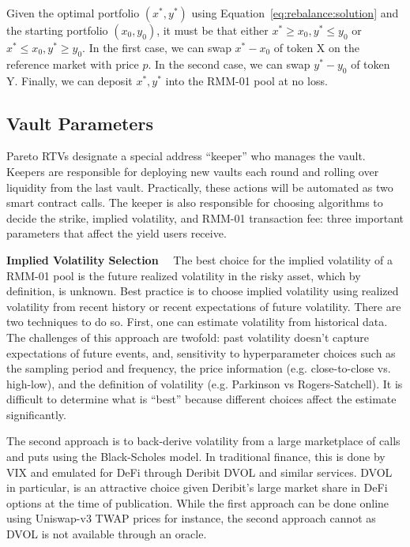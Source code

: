 \documentclass[hidelinks, 12pt]{article}
\begin{document}
Given the optimal portfolio $(x^*, y^*)$ using Equation~\ref{eq:rebalance:solution} and the starting portfolio $(x_0, y_0)$, it must be that either $x^* \geq x_0, y^* \leq y_0$ or $x^* \leq x_0, y^* \geq y_0$. In the first case, we can swap $x^* - x_0$ of token X on the reference market with price $p$. In the second case, we can swap $y^* - y_0$ of token Y. Finally, we can deposit $x^*, y^*$ into the RMM-01 pool at no loss.

\subsection{Vault Parameters}
\label{sec:management}

Pareto RTVs designate a special address ``keeper'' who manages the vault. Keepers are responsible for deploying new vaults each round and rolling over liquidity from the last vault. Practically, these actions will be automated as two smart contract calls.
The keeper is also responsible for choosing algorithms to decide the strike, implied volatility, and RMM-01 transaction fee: three important parameters that affect the yield users receive. 

\textbf{Implied Volatility Selection}$\quad$ The best choice for the implied volatility of a RMM-01 pool is the future realized volatility in the risky asset, which by definition, is unknown. 
Best practice is to choose implied volatility using realized volatility from recent history or recent expectations of future volatility.
There are two techniques to do so. First, one can estimate volatility from historical data. The challenges of this approach are twofold: past volatility doesn't capture expectations of future events, and, sensitivity to hyperparameter choices such as the sampling period and frequency, the price information (e.g. close-to-close vs. high-low), and the definition of volatility (e.g. Parkinson vs Rogers-Satchell). 
It is difficult to determine what is ``best'' because different choices affect the estimate significantly. 

The second approach is to back-derive volatility from a large marketplace of calls and puts using the Black-Scholes model. 
In traditional finance, this is done by VIX and emulated for DeFi through Deribit DVOL and similar services.
DVOL in particular, is an attractive choice given Deribit's large market share in DeFi options at the time of publication.
While the first approach can be done online using Uniswap-v3 TWAP prices for instance, the second approach cannot as DVOL is not available through an oracle. 
\end{document}
